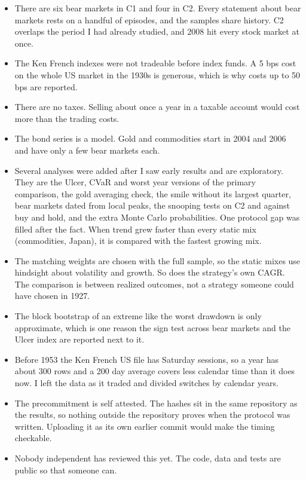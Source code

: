 \documentclass[11pt]{article}
\begin{document}
\begin{itemize}
\item There are six bear markets in C1 and four in C2. Every statement about bear markets rests on a handful of episodes, and the samples share history. C2 overlaps the period I had already studied, and 2008 hit every stock market at once.
\item The Ken French indexes were not tradeable before index funds. A 5 bps cost on the whole US market in the 1930s is generous, which is why costs up to 50 bps are reported.
\item There are no taxes. Selling about once a year in a taxable account would cost more than the trading costs.
\item The bond series is a model. Gold and commodities start in 2004 and 2006 and have only a few bear markets each.
\item Several analyses were added after I saw early results and are exploratory. They are the Ulcer, CVaR and worst year versions of the primary comparison, the gold averaging check, the smile without its largest quarter, bear markets dated from local peaks, the snooping tests on C2 and against buy and hold, and the extra Monte Carlo probabilities. One protocol gap was filled after the fact. When trend grew faster than every static mix (commodities, Japan), it is compared with the fastest growing mix.
\item The matching weights are chosen with the full sample, so the static mixes use hindsight about volatility and growth. So does the strategy's own CAGR. The comparison is between realized outcomes, not a strategy someone could have chosen in 1927.
\item The block bootstrap of an extreme like the worst drawdown is only approximate, which is one reason the sign test across bear markets and the Ulcer index are reported next to it.
\item Before 1953 the Ken French US file has Saturday sessions, so a year has about 300 rows and a 200 day average covers less calendar time than it does now. I left the data as it traded and divided switches by calendar years.
\item The precommitment is self attested. The hashes sit in the same repository as the results, so nothing outside the repository proves when the protocol was written. Uploading it as its own earlier commit would make the timing checkable.
\item Nobody independent has reviewed this yet. The code, data and tests are public so that someone can.
\end{itemize}
\end{document}
